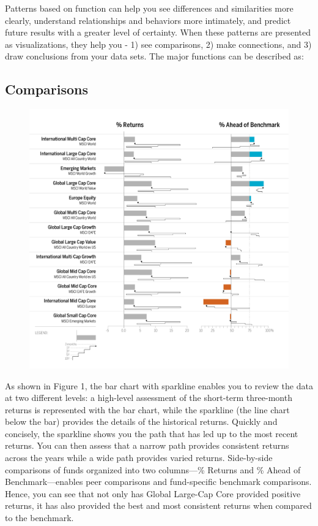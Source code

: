 \documentclass[]{book}
\theoremstyle{definition}
\theoremstyle{definition}
\theoremstyle{definition}
\theoremstyle{remark}
\begin{document}
Patterns based on function can help you see differences and similarities
more clearly, understand relationships and behaviors more intimately,
and predict future results with a greater level of certainty. When these
patterns are presented as visualizations, they help you - 1) see
comparisons, 2) make connections, and 3) draw conclusions from your data
sets. The major functions can be described as:

\subsection{Comparisons}\label{comparisons}

\begin{figure}
\centering
\includegraphics{images/patten-1.jpg}
\caption{}
\end{figure}

As shown in Figure 1, the bar chart with sparkline enables you to review
the data at two different levels: a high-level assessment of the
short-term three-month returns is represented with the bar chart, while
the sparkline (the line chart below the bar) provides the details of the
historical returns. Quickly and concisely, the sparkline shows you the
path that has led up to the most recent returns. You can then assess
that a narrow path provides consistent returns across the years while a
wide path provides varied returns. Side-by-side comparisons of funds
organized into two columns---\% Returns and \% Ahead of
Benchmark---enables peer comparisons and fund-specific benchmark
comparisons. Hence, you can see that not only has Global Large-Cap Core
provided positive returns, it has also provided the best and most
consistent returns when compared to the benchmark.
\end{document}
